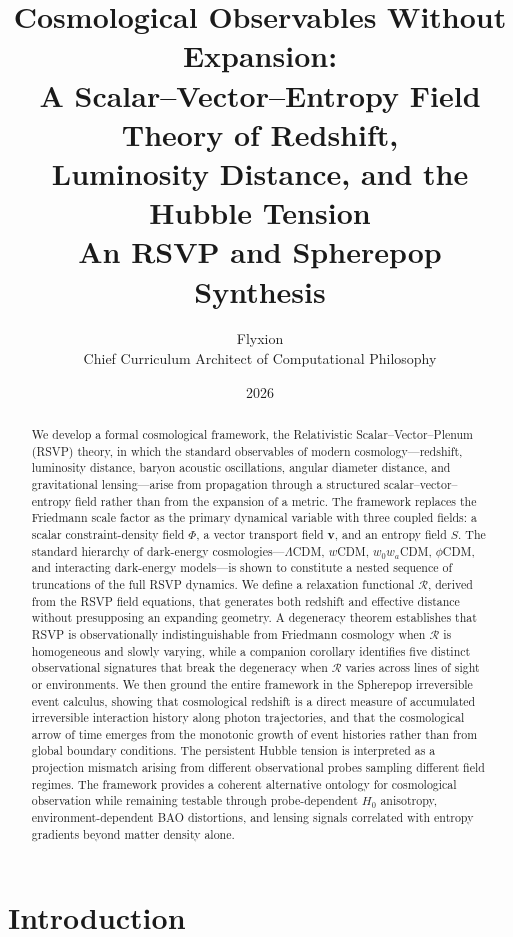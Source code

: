 \documentclass[12pt,a4paper]{article}
\title{\textbf{Cosmological Observables Without Expansion:\\
A Scalar--Vector--Entropy Field Theory of Redshift,\\
Luminosity Distance, and the Hubble Tension}\\[1em]
{\large An RSVP and Spherepop Synthesis}}
\author{Flyxion\\
\small Chief Curriculum Architect of Computational Philosophy}
\date{2026}
\theoremstyle{remark}
\newcommand{\vv}{\mathbf{v}}
\newcommand{\Rcal}{\mathcal{R}}
\begin{document}
\maketitle

\begin{abstract}
We develop a formal cosmological framework, the Relativistic Scalar--Vector--Plenum (RSVP) theory, in which the standard observables of modern cosmology---redshift, luminosity distance, baryon acoustic oscillations, angular diameter distance, and gravitational lensing---arise from propagation through a structured scalar--vector--entropy field rather than from the expansion of a metric. The framework replaces the Friedmann scale factor as the primary dynamical variable with three coupled fields: a scalar constraint-density field $\Phi$, a vector transport field $\vv$, and an entropy field $S$. The standard hierarchy of dark-energy cosmologies---$\Lambda$CDM, $w$CDM, $w_0 w_a$CDM, $\phi$CDM, and interacting dark-energy models---is shown to constitute a nested sequence of truncations of the full RSVP dynamics. We define a relaxation functional $\Rcal$, derived from the RSVP field equations, that generates both redshift and effective distance without presupposing an expanding geometry. A degeneracy theorem establishes that RSVP is observationally indistinguishable from Friedmann cosmology when $\Rcal$ is homogeneous and slowly varying, while a companion corollary identifies five distinct observational signatures that break the degeneracy when $\Rcal$ varies across lines of sight or environments. We then ground the entire framework in the Spherepop irreversible event calculus, showing that cosmological redshift is a direct measure of accumulated irreversible interaction history along photon trajectories, and that the cosmological arrow of time emerges from the monotonic growth of event histories rather than from global boundary conditions. The persistent Hubble tension is interpreted as a projection mismatch arising from different observational probes sampling different field regimes. The framework provides a coherent alternative ontology for cosmological observation while remaining testable through probe-dependent $H_0$ anisotropy, environment-dependent BAO distortions, and lensing signals correlated with entropy gradients beyond matter density alone.
\end{abstract}

\tableofcontents
\newpage

\section{Introduction}
\end{document}
